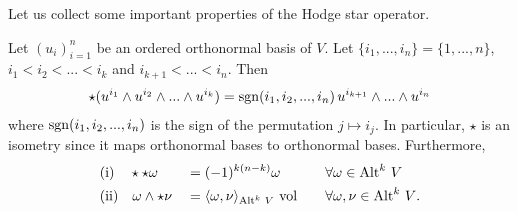 \documentclass[../master_thesis.tex]{subfiles}
\begin{document}
Let us collect some important properties of the Hodge star operator.
\begin{proposition}\label{prop:properties_hodge_star}
    Let $(u_i)_{i=1}^n$ be an ordered orthonormal basis of $V$. Let 
    $\{ i_1, ..., i_n \} = \{ 1, ..., n\}$, $i_1 < i_2 < ... < i_k$ and 
    $i_{k+1} < ... < i_n$. Then
    \begin{align}
        \star (u^{i_1} \wedge u^{i_2} \wedge ... \wedge u^{i_k})
        = \operatorname{sgn}(i_1,i_2,...,i_n) \, u^{i_{k+1}} \wedge ... \wedge u^{i_{n}}
        \label{eq:hodge_star_orthonormal_basis}
    \end{align}
    where $\operatorname{sgn}(i_1,i_2,...,i_n)$ 
    is the sign of the permutation $j \mapsto i_j$. In particular, 
    $\star$ is an isometry since it maps orthonormal bases to orthonormal 
    bases. Furthermore,
    \begin{alignat*}{3}
        &\text{\normalfont(i)} \quad\star \star \omega &&= (-1)^{k(n-k)} \omega \quad &&\forall \omega 
            \in {\operatorname{Alt}^{k}\,V}\\
        &\text{\normalfont(ii)} \quad\omega \wedge \star \nu &&= \langle \omega, \nu \rangle
            _{{\operatorname{Alt}^{k}\,V}}  \, \operatorname{vol} \quad &&\forall \omega, \nu \in {\operatorname{Alt}^{k}\,V}.     
    \end{alignat*}
\end{proposition}
\end{document}
